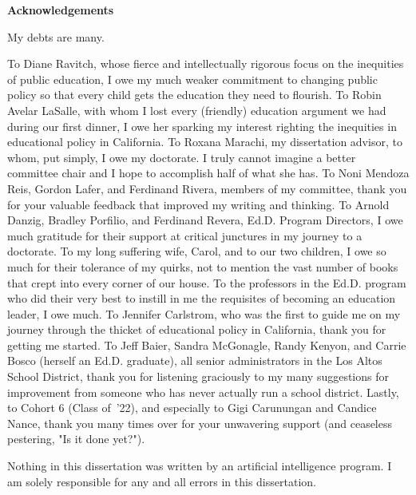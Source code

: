 
\begin{center}
  \textbf{Acknowledgements}\\
\end{center}

My debts are many.
  
To Diane Ravitch, whose fierce and intellectually rigorous focus on the inequities of public education, I owe my much weaker commitment to changing public policy so that every child gets the education they need to flourish. To Robin Avelar LaSalle, with whom I lost every (friendly) education argument we had during our first dinner, I owe her sparking my interest righting the inequities in educational policy in California. To Roxana Marachi, my dissertation advisor, to whom, put simply, I owe my doctorate. I truly cannot imagine a better committee chair and I hope to accomplish half of what she has. To Noni Mendoza Reis, Gordon Lafer, and Ferdinand Rivera, members of my committee, thank you for your valuable feedback that improved my writing and thinking. To Arnold Danzig, Bradley Porfilio, and Ferdinand Revera, Ed.D. Program Directors, I owe much gratitude for their support at critical junctures in my journey to a doctorate. To my long suffering wife, Carol, and to our two children, I owe so much for their tolerance of my quirks, not to mention the vast number of books that crept into every corner of our house. To the professors in the Ed.D. program who did their very best to instill in me the requisites of becoming an education leader, I owe much. To Jennifer Carlstrom, who was the first to guide me on my journey through the thicket of educational policy in California, thank you for getting me started. To Jeff Baier, Sandra McGonagle, Randy Kenyon, and Carrie Bosco (herself an Ed.D. graduate), all senior administrators in the Los Altos School District, thank you for listening graciously to my many suggestions for improvement from someone who has never actually run a school district. Lastly, to Cohort 6 (Class of '22), and especially to Gigi Carunungan and Candice Nance, thank you many times over for your unwavering support (and ceaseless pestering, "Is it done yet?").

Nothing in this dissertation was written by an artificial intelligence program. I am solely responsible for any and all errors in this dissertation.

